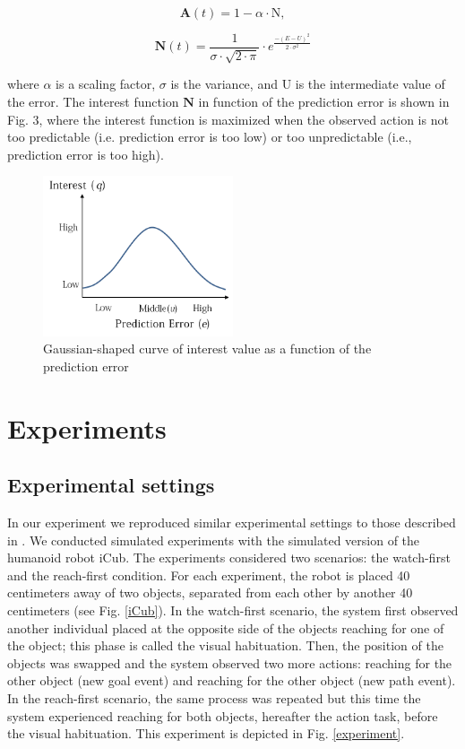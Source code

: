 \documentclass[conference]{IEEEtran}
\begin{document}
\begin{equation}
  \textbf{A}(t) = 1 - \alpha\cdot\text{N},
\end{equation}

\begin{equation}
  \textbf{N}(t) = \frac{1}{\sigma\cdot \sqrt{2\cdot\pi}}\cdot e^{\frac{-(E-U)^2}{2\cdot\sigma^2}}
\end{equation}

where \(\alpha\) is a scaling factor, \(\sigma\) is the variance, and \(\text{U}\) is the intermediate value of the error. The interest function \(\textbf{N}\) in function of the prediction error is shown in Fig. 3, where the interest function is maximized when the observed action is not too predictable (i.e. prediction error is too low) or too unpredictable (i.e., prediction error is too high).

\begin{figure}[!t]
\centering
\includegraphics[width=0.5\textwidth,natwidth=700,natheight=450]{Figure5.png}
\caption{Gaussian-shaped curve of interest value as a function of the prediction error}
\label{figure3}
\end{figure}

\section{Experiments}

\subsection{Experimental settings}
In our experiment we reproduced similar experimental settings to those described in \cite{sommerville2005action}. We conducted simulated experiments with the simulated version of the humanoid robot iCub. The experiments considered two scenarios: the watch-first and the reach-first condition. For each experiment, the robot is placed 40 centimeters away of two objects, separated from each other by another 40 centimeters (see Fig. \ref{iCub}). In the watch-first scenario, the system first observed another individual placed at the opposite side of the objects reaching for one of the object; this phase is called the visual habituation. Then, the position of the objects was swapped and the system observed two more actions: reaching for the other object (new goal event) and reaching for the other object (new path event). In the reach-first scenario, the same process was repeated but this time the system experienced reaching for both objects, hereafter the action task, before the visual habituation. This experiment is depicted in Fig. \ref{experiment}.
\end{document}
